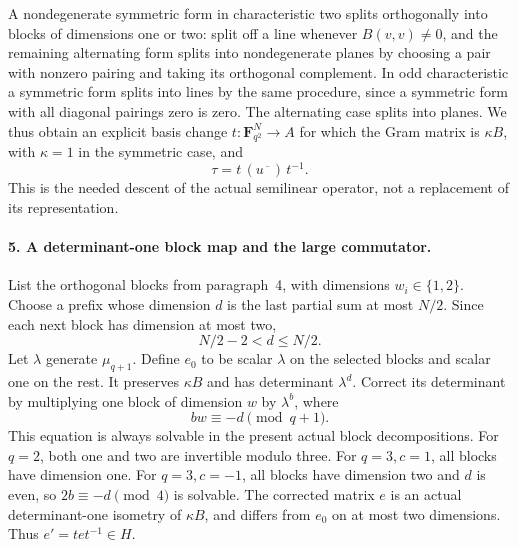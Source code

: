 A nondegenerate symmetric form in characteristic two
splits orthogonally into blocks of dimensions one or
two: split off a line whenever \(B(v,v)\ne0\), and
the remaining alternating form splits into
nondegenerate planes by choosing a pair with
nonzero pairing and taking its orthogonal complement.
In odd characteristic a symmetric form splits into
lines by the same procedure, since a symmetric form
with all diagonal pairings zero is zero. The
alternating case splits into planes. We thus obtain
an explicit basis change
\(t:\mathbf F_{q^2}^{N}\to A\) for which the Gram
matrix is \(\kappa B\), with \(\kappa=1\) in the
symmetric case, and
\[
                  \tau=t\,(u\overline{\phantom{x}})\,t^{-1}.
 \tag{F1T34.19}
\]
This is the needed descent of the actual semilinear
operator, not a replacement of its representation.

\paragraph{5. A determinant-one block map and the large commutator.}
List the orthogonal blocks from paragraph~4, with
dimensions \(w_i\in\{1,2\}\). Choose a prefix whose
dimension \(d\) is the last partial sum at most
\(N/2\). Since each next block has dimension at most
two,
\[
                    N/2-2<d\le N/2.
 \tag{F1T34.20}
\]
Let \(\lambda\) generate \(\mu_{q+1}\). Define
\(e_0\) to be scalar \(\lambda\) on the selected
blocks and scalar one on the rest. It preserves
\(\kappa B\) and has determinant \(\lambda^d\).
Correct its determinant by multiplying one block of
dimension \(w\) by \(\lambda^b\), where
\[
                       bw\equiv-d\pmod{q+1}.
 \tag{F1T34.21}
\]
This equation is always solvable in the present
actual block decompositions. For \(q=2\), both
one and two are invertible modulo three. For
\(q=3,c=1\), all blocks have dimension one.
For \(q=3,c=-1\), all blocks have dimension two
and \(d\) is even, so \(2b\equiv-d\pmod4\)
is solvable. The corrected matrix \(e\) is an
actual determinant-one isometry of \(\kappa B\),
and differs from \(e_0\) on at most two dimensions.
Thus \(e'=tet^{-1}\in H\).

